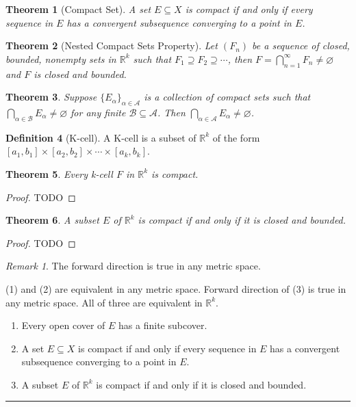 \documentclass[12pt, lettersize]{book}
\theoremstyle{plain}
\newtheorem{thm}{Theorem}[section]
\theoremstyle{definition}
\newtheorem{dfn}[thm]{Definition}
\theoremstyle{remark}
\newtheorem*{rem}{Remark}
\newcommand{\R}{\mathbb{R}}
\newcommand{\lline}{\noindent\rule{\textwidth}{1pt}}
\let\emptyset\varnothing
\begin{document}
	\begin{thm}[Compact Set]
		A set $E\subseteq X$ is compact if and only if every sequence in $E$ has a convergent subsequence converging to a point in $E$.
	\end{thm}
	
	\begin{thm}[Nested Compact Sets Property]
		Let $(F_n)$ be a sequence of closed, bounded, nonempty sets in $\R^k$ such that $F_1\supseteq F_2\supseteq\cdots$, then $F=\bigcap_{n=1}^{\infty}F_n\neq\emptyset$ and $F$ is closed and bounded.
	\end{thm}
	
	\begin{thm}
		Suppose $\{E_\alpha\}_{\alpha\in\mathcal{A}}$ is a collection of compact sets such that $\bigcap_{\alpha\in\mathcal{B}}E_\alpha\neq\emptyset$ for any finite $\mathcal{B}\subseteq \mathcal{A}$. Then $\bigcap_{\alpha\in\mathcal{A}}E_\alpha\neq\emptyset$.
	\end{thm}
	
	\begin{dfn}[K-cell]
		A K-cell is a subset of $\R^k$ of the form $[a_1,b_1]\times[a_2,b_2]\times\cdots\times[a_k,b_k]$.
	\end{dfn}
	
	\begin{thm}
		Every k-cell $F$ in $\mathbb{R}^k$ is compact.
	\end{thm}
	\begin{proof}
		TODO
	\end{proof}
	
	\begin{thm}
		A subset $E$ of $\mathbb{R}^k$ is compact if and only if it is closed and bounded.
	\end{thm}
	\begin{proof}
		TODO
	\end{proof}
	\begin{rem}
		The forward direction is true in any metric space.
	\end{rem}
	
	\begin{tcolorbox}[title=\textbf{Characterization of compact sets}]
		(1) and (2) are equivalent in any metric space. Forward direction of (3) is true in any metric space. All of three are equivalent in $\R^k$.
		\begin{enumerate}
			\item Every open cover of $E$ has a finite subcover.
			\item A set $E\subseteq X$ is compact if and only if every sequence in $E$ has a convergent subsequence converging to a point in $E$.
			\item A subset $E$ of $\mathbb{R}^k$ is compact if and only if it is closed and bounded.
		\end{enumerate}
	\end{tcolorbox}
	\lline
	
\end{document}
